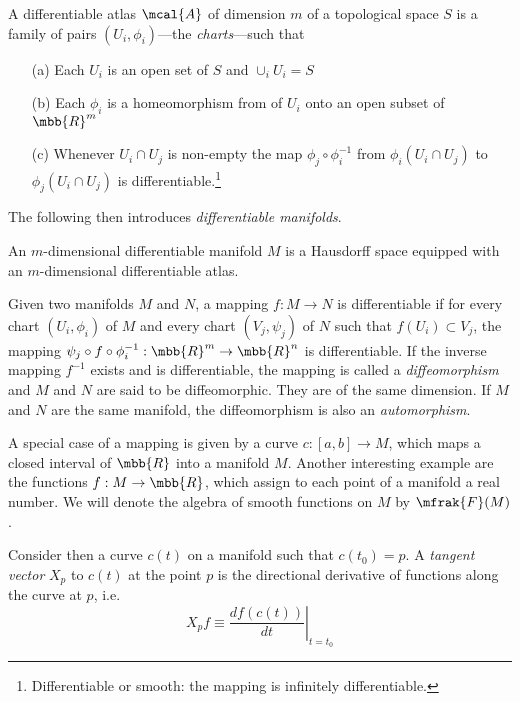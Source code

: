 \documentclass[10pt,reqno]{amsart}
\numberwithin{equation}{section}
\begin{document}
\begin{definition}[Atlas]
	A differentiable atlas $\mcal{A}$ of dimension $m$ of a 
	topological space $S$ is a family of pairs 
	$\left(U_i,\phi_i\right)$---the \emph{charts}---such that
	\begin{itemize}
		\item[(a)] Each $U_i$ is an open set of $S$ and $\cup_i U_i = 
			S$
		\item[(b)] Each $\phi_i$ is a homeomorphism from of $U_i$ 
			onto an open subset of $\mbb{R}^m$
		\item[(c)] Whenever $U_i \cap U_j$ is non-empty the map 
			$\phi_j \circ \phi_i^{-1}$ from $\phi_i(U_i \cap U_j)$ to 
			$\phi_j(U_i \cap U_j)$ is 
			differentiable.\footnote{Differentiable or smooth: the 
				mapping is infinitely differentiable.}
	\end{itemize}
\end{definition}
%
The following then introduces \emph{differentiable manifolds}.
%
\begin{definition}[Manifold]
	An $m$-dimensional differentiable manifold $M$ is a Hausdorff 
	space equipped with an $m$-dimensional differentiable atlas.
\end{definition}
%
Given two manifolds $M$ and $N$, a mapping $f : M \rightarrow N$ 
is differentiable if for every chart $(U_i,\phi_i)$ of $M$ and 
every chart $(V_j,\psi_j)$ of $N$ such that $f(U_i) \subset V_j$, 
the mapping $\psi_j \circ f \circ \phi_i^{-1} : \mbb{R}^m 
\rightarrow \mbb{R}^n$ is differentiable. If the inverse mapping 
$f^{-1}$ exists and is differentiable, the mapping is called a 
\emph{diffeomorphism} and $M$ and $N$ are said to be 
diffeomorphic. They are of the same dimension. If $M$ and $N$ are 
the same manifold, the diffeomorphism is also an 
\emph{automorphism}.

A special case of a mapping is given by a curve $c: [a,b] 
\rightarrow M$, which maps a closed interval of $\mbb{R}$ into a 
manifold $M$. Another interesting example are the functions $f : 
M \rightarrow \mbb{R}$, which assign to each point of a manifold 
a real number. We will denote the algebra of smooth functions on 
$M$ by $\mfrak{F}(M)$.

\blankline
Consider then a curve $c(t)$ on a manifold such that $c(t_0) = 
p$. A \emph{tangent vector} $X_p$ to $c(t)$ at the point $p$ is 
the directional derivative of functions along the curve at $p$, 
i.e.
\begin{equation}
	X_p f \equiv \left. \frac{df(c(t))}{dt}\right|_{t=t_0}
\end{equation}
%
\end{document}
